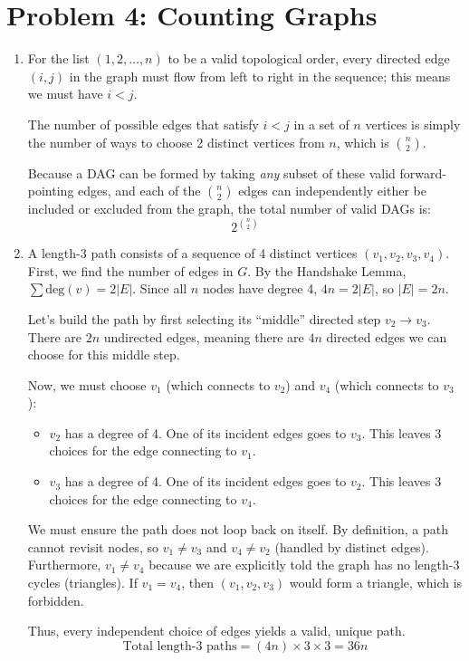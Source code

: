 \documentclass[11pt]{article}
\begin{document}
\section*{Problem 4: Counting Graphs}
\begin{enumerate}[label=\textbf{(\alph*)}]
    \item For the list $(1, 2, \dots, n)$ to be a valid topological order, every directed edge $(i, j)$ in the graph must flow from left to right in the sequence; this means we must have $i < j$.
    
    The number of possible edges that satisfy $i < j$ in a set of $n$ vertices is simply the number of ways to choose 2 distinct vertices from $n$, which is $\binom{n}{2}$. 
    
    Because a DAG can be formed by taking \textit{any} subset of these valid forward-pointing edges, and each of the $\binom{n}{2}$ edges can independently either be included or excluded from the graph, the total number of valid DAGs is:
    $$2^{\binom{n}{2}}$$

    \item A length-3 path consists of a sequence of 4 distinct vertices $(v_1, v_2, v_3, v_4)$. 
    First, we find the number of edges in $G$. By the Handshake Lemma, $\sum \text{deg}(v) = 2|E|$. Since all $n$ nodes have degree 4, $4n = 2|E|$, so $|E| = 2n$.

    Let's build the path by first selecting its ``middle'' directed step $v_2 \to v_3$. There are $2n$ undirected edges, meaning there are $4n$ directed edges we can choose for this middle step.
    
    Now, we must choose $v_1$ (which connects to $v_2$) and $v_4$ (which connects to $v_3$):
    \begin{itemize}
        \item $v_2$ has a degree of 4. One of its incident edges goes to $v_3$. This leaves 3 choices for the edge connecting to $v_1$.
        \item $v_3$ has a degree of 4. One of its incident edges goes to $v_2$. This leaves 3 choices for the edge connecting to $v_4$.
    \end{itemize}

    We must ensure the path does not loop back on itself. By definition, a path cannot revisit nodes, so $v_1 \neq v_3$ and $v_4 \neq v_2$ (handled by distinct edges). Furthermore, $v_1 \neq v_4$ because we are explicitly told the graph has no length-3 cycles (triangles). If $v_1 = v_4$, then $(v_1, v_2, v_3)$ would form a triangle, which is forbidden.
    
    Thus, every independent choice of edges yields a valid, unique path. 
    $$\text{Total length-3 paths} = (4n) \times 3 \times 3 = 36n$$
\end{enumerate}
\end{document}
